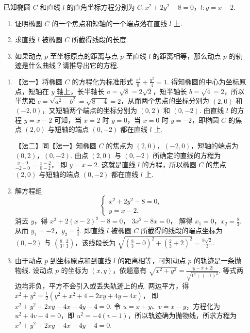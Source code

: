 \begin{problem}

已知椭圆 \(C\) 和直线 \(l\) 的直角坐标方程分别为 \(C:x^{2}+2y^{2}-8=0\)，\(l:y=x-2\).

\begin{enumerate}
\item 证明椭圆 \(C\) 的一个焦点和短轴的一个端点落在直线 \(l\) 上.
\item 求直线 \(l\) 被椭圆 \(C\) 所截得线段的长度.
\item 如果动点 \(p\) 至坐标原点的距离与点 \(p\) 至直线 \(l\) 的距离相等，那么动点 \(p\) 的轨迹是什么曲线？请推导出它的方程.
\end{enumerate}

\begin{solution}
\begin{enumerate}
\item 【法一】将椭圆 \(C\) 的方程化为标准形式
\(\frac{x^{2}}{8}+\frac{y^{2}}{4}=1\).
得知椭圆的中心为坐标原点，短轴在 \(y\) 轴上，长半轴长 \(a=\sqrt{8}=2\sqrt{2}\)，短半轴长 \(b=\sqrt{4}=2\)，所以半焦距 \(c=\sqrt{a^{2}-b^{2}}=\sqrt{8-4}=2\)，从而两个焦点的坐标分别为 \((2,0)\) 和 \((-2,0)\)，又短轴两个端点的坐标分别为 \((0,2)\) 和 \((0,-2)\). 由直线 \(l\) 的方程 \(y=x-2\) 可知，当 \(x=2\) 时 \(y=0\)，当 \(x=0\) 时 \(y=-2\)，即椭圆 \(C\) 的焦点 \((2,0)\) 与短轴的端点 \((0,-2)\) 都在直线 \(l\) 上.

【法二】同【法一】知椭圆 \(C\) 的焦点为 \((2,0)\)，\((-2,0)\)，短轴的端点为 \((0,2)\)，\((0,-2)\). 由点 \((2,0)\) 与 \((0,-2)\) 所确定的直线的方程为
\(\frac{y-0}{-2-0}=\frac{x-2}{0-2}\)，
即
\(y=x-2\).
这就是直线 \(l\) 的方程，所以椭圆 \(C\) 的焦点 \((2,0)\) 与短轴的端点 \((0,-2)\) 都在直线 \(l\) 上.

\item 解方程组
\[
\begin{cases}
x^{2}+2y^{2}-8=0,\\
y=x-2.
\end{cases}
\]
消去 \(y\)，得
\(x^{2}+2(x-2)^{2}-8=0\)，
\(3x^{2}-8x=0\)，
解得
\(x_{1}=0\)，\(x_{2}=\frac{8}{3}\).
从而
\(y_{1}=-2\)，\(y_{2}=\frac{2}{3}\).
即直线 \(l\) 被椭圆 \(C\) 所截得的线段的端点坐标为 \((0,-2)\) 与 \(\left(\frac{8}{3},\frac{2}{3}\right)\)，该线段长为
\(\sqrt{\left(\frac{8}{3}-0\right)^{2}+\left(\frac{2}{3}+2\right)^{2}}=\frac{8\sqrt{2}}{3}\).

\item 由于动点 \(p\) 到坐标原点和到直线 \(l\) 的距离相等，可知动点 \(p\) 的轨迹是一条抛物线. 设动点 \(p\) 的坐标为 \((x,y)\)，依题意有
\(\sqrt{x^{2}+y^{2}}=\frac{|y-x+2|}{\sqrt{1^{2}+(-1)^{2}}}\).
等式两边均非负，平方不会引入或丢失轨迹上的点. 两边平方，得
\(x^{2}+y^{2}=\frac{1}{2}(y^{2}+x^{2}+4-2xy+4y-4x)\)，
即 \(x^{2}+y^{2}+2xy+4x-4y-4=0\). 令 \(u=x+y\)、\(v=x-y\)，方程化为 \(u^{2}+4v-4=0\)，即 \(u^{2}=-4(v-1)\)，所以轨迹确为抛物线，所求方程为 \(x^{2}+y^{2}+2xy+4x-4y-4=0\).
\end{enumerate}
\end{solution}
\end{problem}

